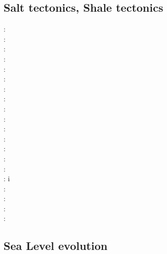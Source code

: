 \subsection{Salt tectonics, Shale tectonics}

\begin{scriptsize}
\nineteenseventyeight: \cite{woid78}\\
\nineteenninetyone: \cite{tars91}\\
\nineteenninetytwo: \cite{zaju92}\\
\nineteenninetythree: \cite{nabr93}\cite{vasv93}\cite{wejv93}\cite{wein93}\\
\nineteenninetysix: \cite{maar96}\\
\nineteenninetyeight: \cite{giju98}\\
\twothousandfour: \cite{istt04}\cite{geim04}\cite{mcmg04}\\
\twothousandfive: \cite{gebi05}\\
\twothousandsix: \cite{maqs06}\\
\twothousandseven: \cite{huja07}\cite{maqs07}\\
\twothousandnine: \cite{grba09}\\
\twothousandten: \cite{albe10}\cite{albi10}\cite{inbe10}\cite{inbe10b}\cite{albs10}\\
\twothousandeleven: \cite{brfo11}\\
\twothousandtwelve: \cite{fejr12}\cite{liqi12}\cite{grbe12}\cite{albe12}\cite{grbi12}\cite{goib12}\cite{rukb12}\\
\twothousandthirteen: \cite{gobi13}\cite{nipc13}\\
\twothousandfourteen: \cite{bakp14}\cite{feka14a}\cite{feka14b}\cite{ghbu14}\cite{nifh14}i\cite{peel14}\\
\twothousandfifteen: \cite{feka15}\cite{cofk15}\\
\twothousandsixteen: \cite{masg16}\cite{albe16}\\
\twothousandseventeen: \cite{grbe17}\cite{henf17}\\
\twothousandnineteen: \cite{hadv19}\cite{clcc19}
\end{scriptsize}

\subsection{Sea Level evolution}

